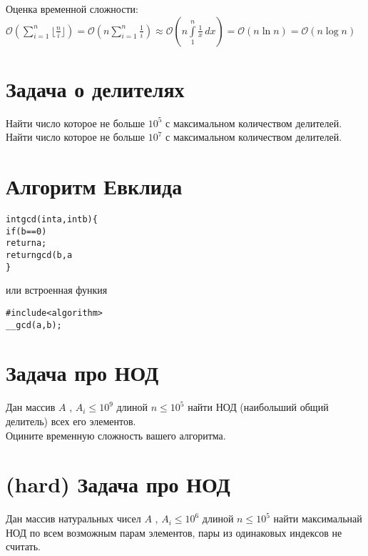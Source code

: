 \documentclass[10pt]{article}
\begin{document}
    Оценка временной сложности:
    \\
    $\mathcal{O}(\sum\limits_{i=1}^n\lfloor \frac{n}{i} \rfloor) = \mathcal{O}(n\sum\limits_{i=1}^n \frac{1}{i})  \approx  \mathcal{O}(n \int\limits_{1}^n \frac{1}{x}\,dx) = \mathcal{O}(n \ln n) = \mathcal{O}(n \log n)$
    \section{Задача о делителях}
    Найти число которое не больше $10^5$ с максимальном количеством делителей.
    \\
    Найти число которое не больше $10^7$ с максимальном количеством делителей.
    \section{Алгоритм Евклида}
        \begin{alltt}
int gcd(int a, int b) \{
    if (b == 0)
        return a;
    return gcd(b, a % b);
\}
    \end{alltt}
или встроенная функия
    \begin{alltt}
#include<algorithm>
__gcd(a , b);
    \end{alltt}
    \section{Задача про НОД} Дан массив $A$ , $A_i \leq 10^9$  длиной $n \leq 10^5$ найти НОД (наибольший общий делитель) всех его элементов.
    \\
    Оцините временную сложность вашего алгоритма.
    \\
    
    \section{(hard) Задача про НОД}
    Дан массив натуральных чисел $A$ , $A_i \leq 10^6$  длиной $n \leq 10^5$ найти максимальнай НОД по всем возможным парам элементов, пары из одинаковых индексов не считать.
    \\
    \\
    
\end{document}
